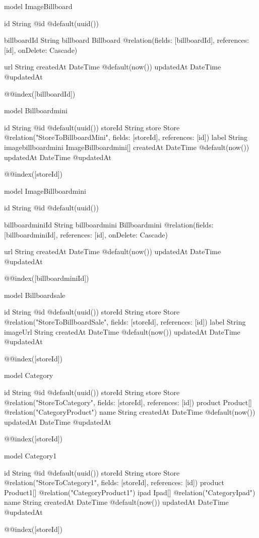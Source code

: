 model ImageBillboard {
  id String @id @default(uuid())

  billboardId String
  billboard   Billboard @relation(fields: [billboardId], references: [id], onDelete: Cascade)

  url       String
  createdAt DateTime @default(now())
  updatedAt DateTime @updatedAt

  @@index([billboardId])
}

model Billboardmini {
  id                 String               @id @default(uuid())
  storeId            String
  store              Store                @relation("StoreToBillboardMini", fields: [storeId], references: [id])
  label              String
  imagebillboardmini ImageBillboardmini[]
  createdAt          DateTime             @default(now())
  updatedAt          DateTime             @updatedAt

  @@index([storeId])
}

model ImageBillboardmini {
  id String @id @default(uuid())

  billboardminiId String
  billboardmini   Billboardmini @relation(fields: [billboardminiId], references: [id], onDelete: Cascade)

  url       String
  createdAt DateTime @default(now())
  updatedAt DateTime @updatedAt

  @@index([billboardminiId])
}

model Billboardsale {
  id        String   @id @default(uuid())
  storeId   String
  store     Store    @relation("StoreToBillboardSale", fields: [storeId], references: [id])
  label     String
  imageUrl  String
  createdAt DateTime @default(now())
  updatedAt DateTime @updatedAt

  @@index([storeId])
}

model Category {
  id        String    @id @default(uuid())
  storeId   String
  store     Store     @relation("StoreToCategory", fields: [storeId], references: [id])
  product   Product[] @relation("CategoryProduct")
  name      String
  createdAt DateTime  @default(now())
  updatedAt DateTime  @updatedAt

  @@index([storeId])
}

model Category1 {
  id        String     @id @default(uuid())
  storeId   String
  store     Store      @relation("StoreToCategory1", fields: [storeId], references: [id])
  product   Product1[] @relation("CategoryProduct1")
  ipad      Ipad[]     @relation("CategoryIpad")
  name      String
  createdAt DateTime   @default(now())
  updatedAt DateTime   @updatedAt

  @@index([storeId])
}

